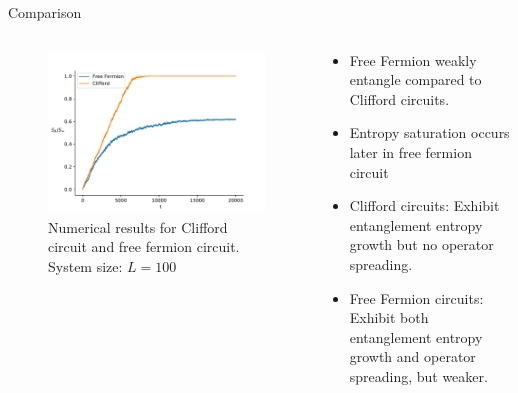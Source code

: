     \begin{frame}{Comparison}
        \begin{columns}
            \begin{column}{0.475\textwidth}
                \begin{figure}
                    \includegraphics[width = \textwidth]{QS_Images/circuit_compare.pdf}
                    \caption{Numerical results for Clifford circuit and free fermion circuit. System size: $L=100$}
                \end{figure}
            \end{column}
        
            \begin{column}{0.5\textwidth}
                \begin{itemize}
                    \item Free Fermion weakly entangle compared to Clifford circuits.
                    \item Entropy saturation occurs later in free fermion circuit
                    \item Clifford circuits: Exhibit entanglement entropy growth but no operator spreading. 
                    \item Free Fermion circuits: Exhibit both entanglement entropy growth and operator spreading, but weaker.
                \end{itemize}
            \end{column}
        
            
        
        
        \end{columns}
                
            \end{frame}
            
